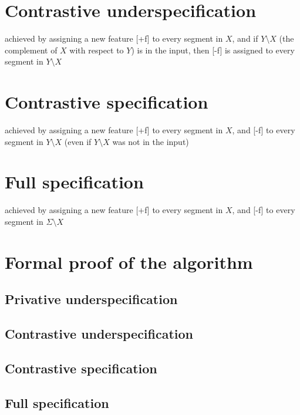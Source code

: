 \documentclass[11pt, oneside]{article}   	%
\begin{document}
\section{Contrastive underspecification}
achieved by assigning a new feature [+f] to every segment in $X$, and if $Y \setminus X$ (the complement of $X$ with respect to $Y$) is in the input, then [-f] is assigned to every segment in $Y \setminus X$

\section{Contrastive specification}
achieved by assigning a new feature [+f] to every segment in $X$, and [-f] to every segment in $Y \setminus X$ (even if $Y \setminus X$ was not in the input)

\section{Full specification}
achieved by assigning a new feature [+f] to every segment in $X$, and [-f] to every segment in $\Sigma \setminus X$

\appendix

\section{Formal proof of the algorithm}

\subsection{Privative underspecification}

\subsection{Contrastive underspecification}

\subsection{Contrastive specification}

\subsection{Full specification}
\end{document}
